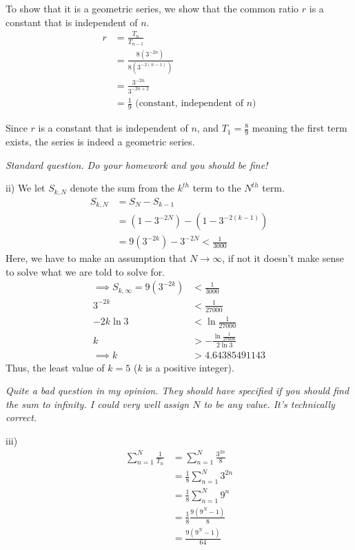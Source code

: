 \documentclass[12pt, a4paper, titlepage]{article}
\begin{document}
To show that it is a geometric series, we show that the common ratio $r$ is a constant that is independent of $n$.
\begin{align*}
    r &= \frac{T_n}{T_{n - 1}} \\
    &= \frac{8(3^{-2n})}{8(3^{-2(n - 1)})} \\
    &= \frac{3^{-2n}}{3^{-2n + 2}} \\
    &= \frac{1}{9} \text{ (constant, independent of $n$)}
\end{align*}

Since $r$ is a constant that is independent of $n$, and $T_1 = \frac{8}{9}$ meaning the first term exists, the series is indeed a geometric series.

\emph{Standard question. Do your homework and you should be fine!}

ii)
We let $S_{k, N}$ denote the sum from the $k^{th}$ term to the $N^{th}$ term.
\begin{align*}
    S_{k,N} &= S_N - S_{k - 1} \\
    &= (1 - 3^{-2N}) - (1 - 3^{-2(k - 1)}) \\
    &= 9(3^{-2k}) - 3^{-2N} < \frac{1}{3000}
\end{align*}
Here, we have to make an assumption that $N \rightarrow \infty$, if not it doesn't make sense to solve what we are told to solve for.
\begin{align*}
    \implies S_{k,\infty} = 9(3^{-2k}) &< \frac{1}{3000} \\
    3^{-2k} &< \frac{1}{27000} \\
    -2k \ln 3 &< \ln \frac{1}{27000} \\
    k &> -\frac{\ln \frac{1}{27000}}{2 \ln 3} \\
    \implies k &> 4.64385491143
\end{align*}
Thus, the least value of $k = 5$ ($k$ is a positive integer).

\emph{Quite a bad question in my opinion. They should have specified if you should find the sum to infinity. I could very well assign $N$ to be any value. It's technically correct.}

iii)
\begin{align*}
    \sum^N_{n = 1} \frac{1}{T_n} &= \sum^N_{n = 1} \frac{3^{2n}}{8} \\
    &= \frac{1}{8} \sum^N_{n = 1} 3^{2n} \\
    &= \frac{1}{8} \sum^N_{n = 1} 9^n \\
    &= \frac{1}{8} \frac{9(9^N - 1)}{8} \\
    &= \frac{9(9^N - 1)}{64}
\end{align*}
\end{document}
